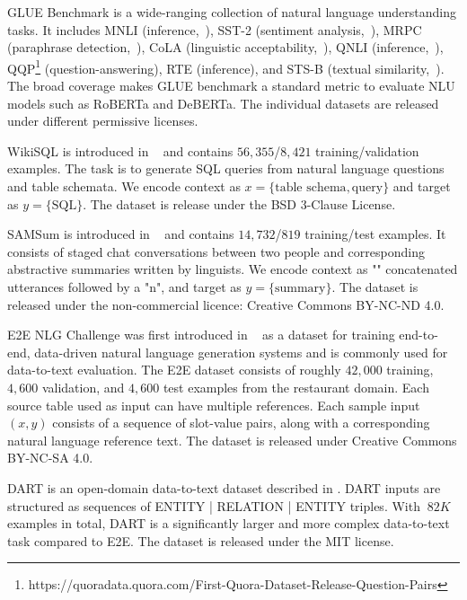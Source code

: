 \documentclass{article} %
\begin{document}
GLUE Benchmark
is a wide-ranging collection of natural language understanding tasks.
It includes MNLI (inference,~\citet{williams-etal-2018-broad}), SST-2 (sentiment analysis,~\citet{socher-etal-2013-recursive}), MRPC (paraphrase detection,~\citet{dolan-brockett-2005-automatically}), CoLA (linguistic acceptability,~\citet{warstadt2018neural}), QNLI (inference,~\citet{DBLP:journals/corr/abs-1806-03822}), QQP\footnote{https://quoradata.quora.com/First-Quora-Dataset-Release-Question-Pairs} (question-answering), RTE (inference), and STS-B (textual similarity,~\citet{Cer_2017}).
The broad coverage makes GLUE benchmark a standard metric to evaluate NLU models such as RoBERTa and DeBERTa.
The individual datasets are released under different permissive licenses.

WikiSQL
is introduced in ~\cite{DBLP:journals/corr/abs-1709-00103} and contains $56,355$/$8,421$ training/validation examples.
The task is to generate SQL queries from natural language questions and table schemata.
We encode context as $x = \{ \text{table schema}, \text{query} \}$ and target as $y = \{ \text{SQL} \}$.
The dataset is release under the BSD 3-Clause License.

SAMSum
is introduced in ~\cite{DBLP:journals/corr/abs-1911-12237} and contains $14,732$/$819$ training/test examples.
It consists of staged chat conversations between two people and corresponding abstractive summaries written by linguists.
We encode context as "\textbackslashn" concatenated utterances followed by a "\textbackslashn{\textbackslash}n", and target as $y = \{ \text{summary} \}$.
The dataset is released under the non-commercial licence: Creative Commons BY-NC-ND 4.0.

E2E NLG Challenge
was first introduced in ~\cite{novikova2017e2e} as a dataset for training end-to-end, data-driven natural language generation systems and is commonly used for data-to-text evaluation. The E2E dataset consists of roughly $42,000$ training, $4,600$ validation, and $4,600$ test examples from the restaurant domain. Each source table used as input can have multiple references. Each sample input $(x, y)$ consists of a sequence of slot-value pairs, along with a corresponding natural language reference text.
The dataset is released under Creative Commons BY-NC-SA 4.0.

DART
is an open-domain data-to-text dataset described in \cite{nan2020dart}.
DART inputs are structured as sequences of ENTITY | RELATION | ENTITY triples.
With $~82K$ examples in total, DART is a significantly larger and more complex data-to-text task compared to E2E.
The dataset is released under the MIT license.
\end{document}
